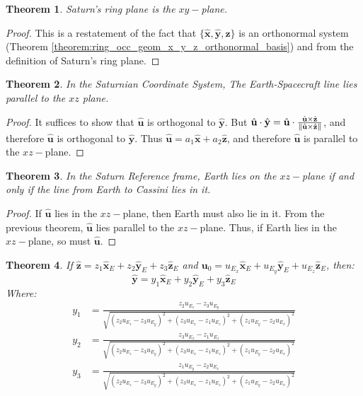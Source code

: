 \documentclass[oneside]{book}
\theoremstyle{mystyle}
\newtheorem{theorem}{Theorem}[section]
\DeclarePairedDelimiter\norm{\lVert}{\rVert}
\begin{document}
\begin{theorem}
Saturn's ring plane is the $xy-$plane.
\end{theorem}
\begin{proof}
This is a restatement of the fact that $\{\hat{\mathbf{x}},\hat{\mathbf{y}},\hat{\mathbf{z}}\}$ is an orthonormal system (Theorem \ref{theorem:ring_occ_geom_x_y_z_orthonormal_basis}) and from the definition of Saturn's ring plane.
\end{proof}
\begin{theorem}
In the Saturnian Coordinate System, The Earth-Spacecraft line lies parallel to the $xz$ plane.
\end{theorem}
\begin{proof}
It suffices to show that $\hat{\mathbf{u}}$ is orthogonal to $\hat{\mathbf{y}}$. But $\hat{\mathbf{u}}\cdot \hat{\mathbf{y}} = \hat{\mathbf{u}}\cdot \frac{\hat{\mathbf{u}}\times \hat{\mathbf{z}}}{\norm{\hat{\mathbf{u}}\times \hat{\mathbf{z}}}}$, and therefore $\hat{\mathbf{u}}$ is orthogonal to $\hat{\mathbf{y}}$. Thus $\hat{\mathbf{u}} = a_1\hat{\mathbf{x}} + a_2\hat{\mathbf{z}}$, and therefore $\hat{\mathbf{u}}$ is parallel to the $xz-$plane.
\end{proof}
\begin{theorem}
In the Saturn Reference frame, Earth lies on the $xz-$plane if and only if the line from Earth to Cassini lies in it.
\end{theorem}
\begin{proof}
If $\hat{\mathbf{u}}$ lies in the $xz-$plane, then Earth must also lie in it. From the previous theorem, $\hat{\mathbf{u}}$ lies parallel to the $xz-$plane. Thus, if Earth lies in the $xz-$plane, so must $\hat{\mathbf{u}}$.
\end{proof}
\begin{theorem}
If $\hat{\mathbf{z}} = z_1\hat{\mathbf{x}}_{E}+z_2\hat{\mathbf{y}}_{E}+z_3\hat{\mathbf{z}}_{E}$ and $\mathbf{u}_{0} = u_{E_{x}}\hat{\mathbf{x}}_{E}+u_{E_{y}}\hat{\mathbf{y}}_{E}+u_{E_{z}}\hat{\mathbf{z}}_{E}$, then:
\begin{equation*}
\hat{\mathbf{y}} = y_{1}\hat{\mathbf{x}}_{E}+y_2\hat{\mathbf{y}}_{E}+y_3\hat{\mathbf{z}}_{E}
\end{equation*}
Where:
\begin{align*}
y_1 &= \frac{z_2u_{E_{z}} - z_{3}u_{E_{y}}}{\sqrt{(z_2u_{E_{z}}-z_3u_{E_{y}})^2+(z_3u_{E_{x}}-z_1u_{E_{z}})^2+(z_1u_{E_{y}}-z_2u_{E_{x}})^2}} \\
y_2 &= \frac{z_3u_{E_{x}} - z_{1}u_{E_{z}}}{\sqrt{(z_2u_{E_{z}}-z_3u_{E_{y}})^2+(z_3u_{E_{x}}-z_1u_{E_{z}})^2+(z_1u_{E_{y}}-z_2u_{E_{x}})^2}} \\
y_3 &= \frac{z_1u_{E_{y}} - z_2u_{E_{x}}}{\sqrt{(z_2u_{E_{z}}-z_3u_{E_{y}})^2+(z_3u_{E_{x}}-z_1u_{E_{z}})^2+(z_1u_{E_{y}}-z_2u_{E_{x}})^2}}
\end{align*}
\end{theorem}
\end{document}
